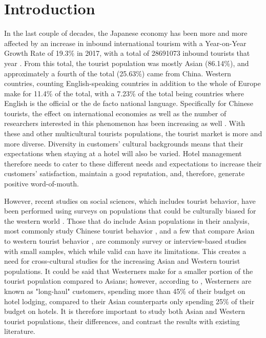 \linenumbers

\section{Introduction}\label{intro}

In the last couple of decades, the Japanese economy has been more and more affected by an increase in inbound international tourism \cite[][]{jones2009} with a Year-on-Year Growth Rate of 19.3\% in 2017, with a total of \num[group-separator={,}]{28691073} inbound tourists that year \cite[][]{jnto2003-2019}. From this total, the tourist population was mostly Asian (86.14\%), and approximately a fourth of the total (25.63\%) came from China. Western countries, counting English-speaking countries in addition to the whole of Europe make for 11.4\% of the total, with a 7.23\% of the total being countries where English is the official or the de facto national language. Specifically for Chinese tourists, the effect on international economies as well as the number of researchers interested in this phenomenon has been increasing as well \cite[][]{sun2017}. With these and other multicultural tourists populations, the tourist market is more and more diverse. Diversity in customers' cultural backgrounds means that their expectations when staying at a hotel will also be varied. Hotel management therefore needs to cater to these different needs and expectations to increase their customers' satisfaction, maintain a good reputation, and, therefore, generate positive word-of-mouth.

However, recent studies on social sciences, which includes tourist behavior, have been performed using surveys on populations that could be culturally biased for the western world \cite[][]{nielsen2017, jones2010WEIRD, guaratne2009, hogan1978biases}. Those that do include Asian populations in their analysis, most commonly study Chinese tourist behavior \cite[e.g.][]{liu2019, chang2010, dongyang2015}, and a few that compare Asian to western tourist behavior \cite[e.g.][]{choi2000}, are commonly survey or interview-based studies with small samples, which while valid can have its limitations. This creates a need for cross-cultural studies for the increasing Asian and Western tourist populations. It could be said that Westerners make for a smaller portion of the tourist population compared to Asians; however, according to \cite{choi2000}, Westerners are known as "long-haul" customers, spending more than 45\% of their budget on hotel lodging, compared to their Asian counterparts only spending 25\% of their budget on hotels. It is therefore important to study both Asian and Western tourist populations, their differences, and contrast the results with existing literature. 


